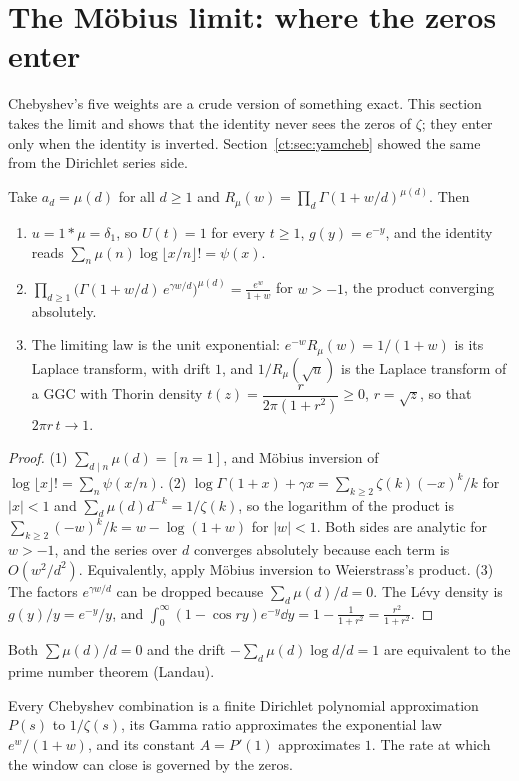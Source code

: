 \section{The M\"obius limit: where the zeros enter}\label{ct:sec:mobius}

Chebyshev's five weights are a crude version of something exact. This section takes the limit and shows that the identity never sees the zeros of $\zeta$; they enter only when the identity is inverted. Section~\ref{ct:sec:yamcheb} showed the same from the Dirichlet series side.

\begin{theorem}\label{ct:thm:mobius}
Take $a_d=\mu(d)$ for all $d\ge1$ and $R_\mu(w)=\prod_d\Gamma(1+w/d)^{\mu(d)}$. Then
\begin{enumerate}
\item $u=1*\mu=\delta_1$, so $U(t)=1$ for every $t\ge1$, $g(y)=e^{-y}$, and the identity reads $\sum_n\mu(n)\log\lfloor x/n\rfloor!=\psi(x)$.
\item $\displaystyle\prod_{d\ge1}\Big(\Gamma(1+w/d)\,e^{\gamma w/d}\Big)^{\mu(d)}=\frac{e^{w}}{1+w}$ for $w>-1$, the product converging absolutely.
\item The limiting law is the unit exponential: $e^{-w}R_\mu(w)=1/(1+w)$ is its Laplace transform, with drift $1$, and $1/R_\mu(\sqrt u)$ is the Laplace transform of a GGC with Thorin density $t(z)=\dfrac{r}{2\pi(1+r^2)}\ge0$, $r=\sqrt z$, so that $2\pi r\,t\to1$.
\end{enumerate}
\end{theorem}
\begin{proof}
(1) $\sum_{d\mid n}\mu(d)=[n=1]$, and M\"obius inversion of $\log\lfloor x\rfloor!=\sum_n\psi(x/n)$. (2) $\log\Gamma(1+x)+\gamma x=\sum_{k\ge2}\zeta(k)(-x)^k/k$ for $|x|<1$ and $\sum_d\mu(d)d^{-k}=1/\zeta(k)$, so the logarithm of the product is $\sum_{k\ge2}(-w)^k/k=w-\log(1+w)$ for $|w|<1$. Both sides are analytic for $w>-1$, and the series over $d$ converges absolutely because each term is $O(w^2/d^2)$. Equivalently, apply M\"obius inversion to Weierstrass's product. (3) The factors $e^{\gamma w/d}$ can be dropped because $\sum_d\mu(d)/d=0$. The L\'evy density is $g(y)/y=e^{-y}/y$, and $\int_0^\infty(1-\cos ry)e^{-y}\dd y=1-\frac1{1+r^2}=\frac{r^2}{1+r^2}$.
\end{proof}
Both $\sum\mu(d)/d=0$ and the drift $-\sum_d\mu(d)\log d/d=1$ are equivalent to the prime number theorem (Landau).

Every Chebyshev combination is a finite Dirichlet polynomial approximation $P(s)$ to $1/\zeta(s)$, its Gamma ratio approximates the exponential law $e^w/(1+w)$, and its constant $A=P'(1)$ approximates $1$. The rate at which the window can close is governed by the zeros.


